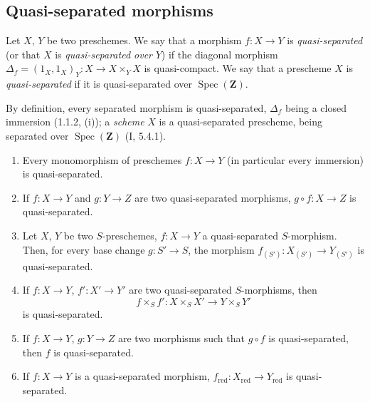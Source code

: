 \subsection{Quasi-separated morphisms}
\label{subsection:IV.1.2}

\begin{definition}[1.2.1]
\label{IV.1.2.1}
Let $X$, $Y$ be two preschemes. We say that a morphism $f:X\to Y$ is
\emph{quasi-separated} (or that $X$ is \emph{quasi-separated over} $Y$) if
the diagonal morphism
$\Delta_f=(1_X,1_X)_Y:X\to X\times_Y X$ is quasi-compact. We say that a
prescheme $X$ is \emph{quasi-separated} if it is quasi-separated over
$\operatorname{Spec}(\mathbf Z)$.
\end{definition}

By definition, every separated morphism is quasi-separated, $\Delta_f$ being a
closed immersion (1.1.2, (i)); a \emph{scheme} $X$ is a quasi-separated
prescheme, being separated over $\operatorname{Spec}(\mathbf Z)$ (I, 5.4.1).

\begin{proposition}[1.2.2]
\label{IV.1.2.2}
\begin{enumerate}
  \item[(i)] Every monomorphism of preschemes $f:X\to Y$ (in particular every
  immersion) is quasi-separated.
  \item[(ii)] If $f:X\to Y$ and $g:Y\to Z$ are two quasi-separated morphisms,
  $g\circ f:X\to Z$ is quasi-separated.
  \item[(iii)] Let $X$, $Y$ be two $S$-preschemes, $f:X\to Y$ a quasi-separated
  $S$-morphism. Then, for every base change $g:S'\to S$, the morphism
  $f_{(S')}:X_{(S')}\to Y_{(S')}$ is quasi-separated.
  \item[(iv)] If $f:X\to Y$, $f':X'\to Y'$ are two quasi-separated $S$-morphisms,
  then
  \[
    f\times_S f':X\times_S X'\to Y\times_S Y'
  \]
  is quasi-separated.
  \item[(v)] If $f:X\to Y$, $g:Y\to Z$ are two morphisms such that $g\circ f$
  is quasi-separated, then $f$ is quasi-separated.
  \item[(vi)] If $f:X\to Y$ is a quasi-separated morphism,
  $f_{\mathrm{red}}:X_{\mathrm{red}}\to Y_{\mathrm{red}}$ is quasi-separated.
\end{enumerate}
\end{proposition}

